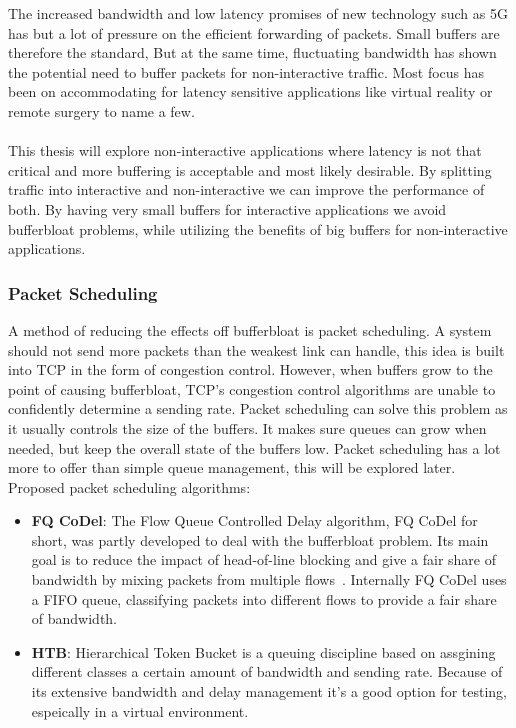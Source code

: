 \documentclass[a4paper,english, 11pt]{report}
\begin{document}
The increased bandwidth and low latency promises of new technology such as 5G has but a lot of pressure on the efficient forwarding of packets. Small buffers are therefore the standard, But at the same time, fluctuating bandwidth has shown the potential need to buffer packets for non-interactive traffic.
Most focus has been on accommodating for latency sensitive applications like virtual reality or remote surgery to name a few.\\\\
This thesis will explore non-interactive applications where latency is not that critical and more buffering is acceptable and most likely desirable. By splitting traffic into interactive and non-interactive we can improve the performance of both. By having very small buffers for interactive applications we avoid bufferbloat problems, while utilizing the benefits of big buffers for non-interactive applications.\\

\subsubsection{Packet Scheduling}
A method of reducing the effects off bufferbloat is packet scheduling. A system should not send more packets than the weakest link can handle, this idea is built into TCP in the form of congestion control. However, when buffers grow to the point of causing bufferbloat, TCP's congestion control algorithms are unable to confidently determine a sending rate. Packet scheduling can solve this problem as it usually controls the size of the buffers. It makes sure queues can grow when needed, but keep the overall state of the buffers low. Packet scheduling has a lot more to offer than simple queue management, this will be explored later.\\

Proposed packet scheduling algorithms:
\begin{itemize}
  \item \textbf{FQ CoDel}: The Flow Queue Controlled Delay algorithm, FQ CoDel for short, was partly developed to deal with the bufferbloat problem. Its main goal is to reduce the impact of head-of-line blocking and give a fair share of bandwidth by mixing packets from multiple flows~\cite{fq_codel_rfc}. Internally FQ CoDel uses a FIFO queue, classifying packets into different flows to provide a fair share of bandwidth.
  \item \textbf{HTB}: Hierarchical Token Bucket is a queuing discipline based on assgining different classes a certain amount of bandwidth and sending rate. Because of its extensive bandwidth and delay management it's a good option for testing, espeically in a virtual environment.
\end{itemize}
\end{document}
